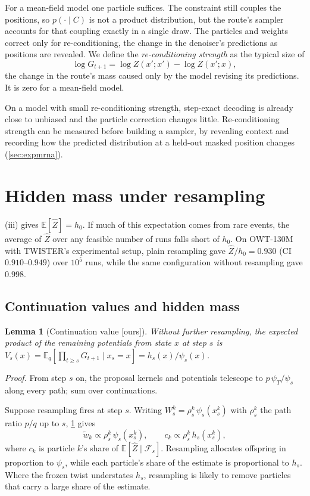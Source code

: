 \documentclass[11pt]{article}
\newtheorem{lemma}[theorem]{Lemma}
\theoremstyle{definition}
\newcommand{\E}{\mathbb{E}}
\newcommand{\Zh}{\widehat Z}
\newcommand{\wt}{\tilde w}
\newcommand{\status}[1]{\textsf{\small[#1]}}
\newcommand{\proofref}[1]{\par\noindent\textit{Proof.} #1\par\smallskip}
\begin{document}
For a mean-field model one particle suffices. The constraint still couples the positions, so $p(\cdot\mid C)$ is
not a product distribution, but the route's sampler accounts for that coupling exactly in a single draw. The
particles and weights correct only for re-conditioning, the change in the denoiser's predictions as positions are
revealed. We define the \emph{re-conditioning strength} as the typical size of
\[
  \log G_{t+1}=\log Z(x';x')-\log Z(x';x),
\]
the change in the route's mass caused only by the model revising its predictions. It is zero for a mean-field
model.

On a model with small re-conditioning strength, step-exact decoding is already close to unbiased and the particle
correction changes little. Re-conditioning strength can be measured before building a sampler, by revealing
context and recording how the predicted distribution at a held-out masked position changes (\cref{sec:expmrna}).

\section{Hidden mass under resampling}\label{sec:practice}

(iii) gives $\E[\Zh]=h_0$. If much of this expectation comes from rare events, the average of $\Zh$
over any feasible number of runs falls short of $h_0$. On OWT-130M with TWISTER's experimental setup, plain
resampling gave $\Zh/h_0=0.930$ (CI $0.910$--$0.949$) over $10^5$ runs, while the same configuration without
resampling gave $0.998$.

\subsection{Continuation values and hidden mass}
\begin{lemma}[Continuation value \status{ours}]\label{lem:cont}
Without further resampling, the expected product of the remaining potentials from state $x$ at step $s$ is
$V_s(x)=\E_q[\prod_{t\ge s}G_{t+1}\mid x_s=x]=h_s(x)/\psi_s(x)$.
\end{lemma}
\proofref{From step $s$ on, the proposal kernels and potentials telescope to $p\,\psi_T/\psi_s$ along every path;
sum over continuations.}

Suppose resampling fires at step $s$. Writing $W^k_s=\rho^k_s\,\psi_s(x^k_s)$ with $\rho^k_s$ the path ratio
$p/q$ up to $s$, \cref{lem:cont} gives
\begin{equation}\label{eq:mismatch}
  \wt_k\propto\rho^k_s\,\psi_s(x^k_s),\qquad
  c_k\propto\rho^k_s\,h_s(x^k_s),
\end{equation}
where $c_k$ is particle $k$'s share of $\E[\Zh\mid\mathcal F_s]$. Resampling allocates offspring in proportion to
$\psi_s$, while each particle's share of the estimate is proportional to $h_s$. Where the frozen twist understates
$h_s$, resampling is likely to remove particles that carry a large share of the estimate.
\end{document}
